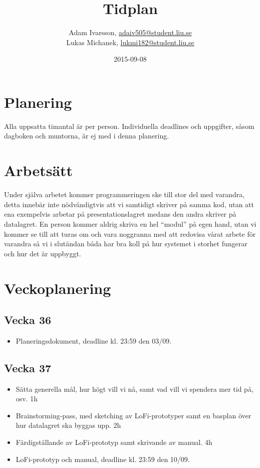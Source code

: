 \documentclass{TDP003mall}
\author{Adam Ivarsson, \url{adaiv505@student.liu.se}\\
  Lukas Michanek, \url{lukmi182@student.liu.se}}
\title{Tidplan}
\date{2015-09-08}
\begin{document}
\projectpage
\section{Planering}
Alla uppsatta timantal är per person. Individuella deadlines och uppgifter, såsom dagboken och muntorna, är ej med
i denna planering.

\section{Arbetsätt}

Under själva arbetet kommer programmeringen ske till stor del med varandra, detta innebär inte nödvändigtvis att vi
samtidigt skriver på samma kod, utan att ena exempelvis arbetar på presentationslagret medans den andra skriver på
datalagret. En person kommer aldrig skriva en hel “modul” på egen hand, utan vi kommer se till att turas om och vara
noggranna med att redovisa vårat arbete för varandra så vi i slutändan båda har bra koll på hur systemet i storhet
fungerar och hur det är uppbyggt.

\section{Veckoplanering}

\subsection{Vecka 36}
\begin{itemize}
\item Planeringsdokument, deadline kl. 23:59 den 03/09.
\end{itemize}

\subsection{Vecka 37}
\begin{itemize}
\item Sätta generella mål, hur högt vill vi nå, samt vad vill vi spendera mer tid på, osv. 1h
\item Brainstorming-pass, med sketching av LoFi-prototyper samt en basplan över hur datalagret ska byggas upp. 2h
\item Färdigställande av LoFi-prototyp samt skrivande av manual. 4h
\item LoFi-prototyp och manual, deadline kl. 23:59 den 10/09.
\end{itemize} 
\end{document}
